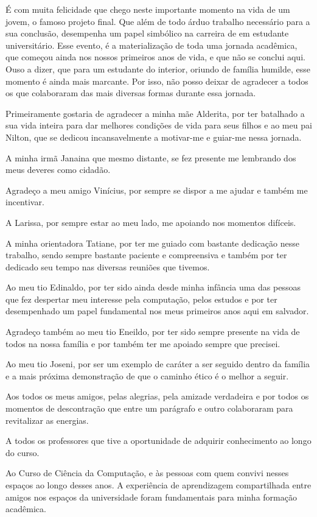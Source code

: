 É com muita felicidade que chego neste importante momento na vida de um jovem, o famoso projeto
final. Que além de todo árduo trabalho necessário para a sua conclusão, desempenha um papel
simbólico na carreira de em estudante universitário. Esse evento, é a materialização de toda uma
jornada acadêmica, que começou ainda nos nossos primeiros anos de vida, e que não se conclui aqui.
Ouso a dizer, que para um estudante do interior, oriundo de família humilde, esse momento é ainda
mais marcante. Por isso, não posso deixar
de agradecer a todos os que colaboraram das mais diversas formas durante essa jornada.

Primeiramente gostaria de agradecer a minha mãe Alderita, por ter batalhado a sua vida inteira para
dar melhores condições de vida para seus filhos e ao meu pai Nilton, que se dedicou incansavelmente a
motivar-me e guiar-me nessa jornada. 

A minha irmã Janaina que mesmo distante, se fez presente  me lembrando
dos meus deveres como cidadão.

Agradeço a meu amigo Vinícius, por sempre se dispor a me ajudar e também me incentivar. 

A Larissa, por sempre estar ao meu lado, me apoiando nos momentos difíceis. 

A minha orientadora Tatiane, por ter me guiado com bastante dedicação nesse trabalho, sendo sempre
bastante paciente e compreensiva e também por ter dedicado seu tempo nas diversas reuniões que
tivemos.

Ao meu tio Edinaldo, por ter sido ainda desde minha infância uma das pessoas que fez despertar meu
interesse pela computação, pelos estudos e por ter desempenhado um papel fundamental nos meus
primeiros anos aqui em salvador.

Agradeço também ao meu tio Eneildo, por ter sido sempre presente na vida de todos na nossa família e
por também ter me apoiado sempre que precisei.

Ao meu tio Joseni, por ser um exemplo de caráter a ser seguido dentro da família e a mais próxima
demonstração de que o caminho ético é o melhor a seguir. 

Aos todos os meus amigos, pelas alegrias, pela amizade verdadeira e por todos os momentos de
descontração que entre um parágrafo e outro colaboraram para revitalizar as energias.

A todos os professores que tive a oportunidade de adquirir conhecimento ao longo do curso.

Ao Curso de Ciência da Computação, e às pessoas com quem convivi nesses espaços ao longo desses
anos. A experiência de aprendizagem compartilhada entre amigos nos espaços da universidade foram
fundamentais para minha formação acadêmica.
